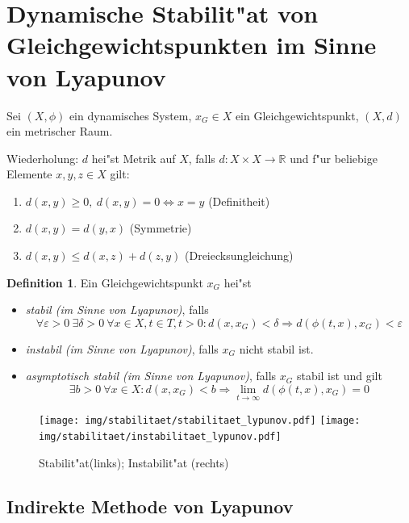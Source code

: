 \documentclass[a4paper, 13pt]{scrreprt}
\theoremstyle{definition} \newtheorem{definition}{Definition}[section]
\begin{document}
\section{Dynamische Stabilit"at von Gleichgewichtspunkten im Sinne von Lyapunov}
Sei $(X, \phi)$ ein dynamisches System, $x_G\in X$ ein Gleichgewichtspunkt, $(X, d)$ ein metrischer Raum.

Wiederholung: $d$ hei"st Metrik auf $X$, falls $d\colon X \times X \to \mathbb{R}$ und f"ur beliebige Elemente $x, y, z\in X$ gilt:
\begin{enumerate}
\item $d(x,y) \geq 0, \ d(x, y) = 0 \Leftrightarrow x = y$ (Definitheit)
\item $d(x,y) = d(y, x)$ (Symmetrie)
\item $d(x, y) \leq d(x,z) + d(z, y) $ (Dreiecksungleichung)
\end{enumerate}

\begin{definition}
Ein Gleichgewichtspunkt $x_G$ hei"st
\begin{itemize}
\item \emph{stabil (im Sinne von Lyapunov)}, falls 
$$ \forall \varepsilon > 0 \ \exists \delta > 0 \ \forall x \in X, t \in T, t > 0: d(x, x_G) < \delta \Rightarrow d\left(\phi(t, x), x_G\right) < \varepsilon$$
\item \emph{instabil (im Sinne von Lyapunov)}, falls $x_G$ nicht stabil ist.
\item \emph{asymptotisch stabil (im Sinne von Lyapunov)}, falls $x_G$ stabil ist und gilt
$$ \exists b > 0\ \forall x \in X: d(x, x_G) < b \Rightarrow \lim_{t\to\infty}{d\left(\phi(t, x), x_G\right)} = 0$$
\end{itemize}
\end{definition}
\begin{figure}[htpb]
\centering
\texttt{[image: img/stabilitaet/stabilitaet\_lypunov.pdf]}
\texttt{[image: img/stabilitaet/instabilitaet\_lypunov.pdf]}
\caption{Stabilit"at(links); Instabilit"at (rechts)}
\end{figure}

\subsection{Indirekte Methode von Lyapunov}
\end{document}
